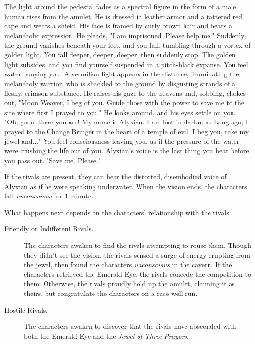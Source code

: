 \documentclass[letterpaper, 11pt, bg=full, twocolumn]{dndbook}
\begin{document}
\begin{DndReadAloud}
The light around the pedestal fades as a spectral figure in the form of a male human rises from the amulet. He is dressed in leather armor and a tattered red cape and wears a shield. His face is framed by curly brown hair and bears a melancholic expression. He pleads, "I am imprisoned. Please help me."
Suddenly, the ground vanishes beneath your feet, and you fall, tumbling through a vortex of golden light. You fall deeper, deeper, deeper, then suddenly stop. The golden light subsides, and you find yourself suspended in a pitch-black expanse. You feel water buoying you. A vermilion light appears in the distance, illuminating the melancholy warrior, who is shackled to the ground by disgusting strands of a fleshy, crimson substance.
He raises his gaze to the heavens and, sobbing, chokes out, "Moon Weaver, I beg of you. Guide those with the power to save me to the site where first I prayed to you." He looks around, and his eyes settle on you. "Oh, gods, there you are! My name is Alyxian. I am lost in darkness. Long ago, I prayed to the Change Bringer in the heart of a temple of evil. I beg you, take my jewel and..."
You feel consciousness leaving you, as if the pressure of the water were crushing the life out of you. Alyxian's voice is the last thing you hear before you pass out. "Save me. Please."
\end{DndReadAloud}

If the rivals are present, they can hear the distorted, disembodied voice of Alyxian as if he were speaking underwater. When the vision ends, the characters fall \textit{unconscious} for 1 minute.

What happens next depends on the characters' relationship with the rivals:

\begin{description}
\item[Friendly or Indifferent Rivals.] The characters awaken to find the rivals attempting to rouse them. Though they didn't see the vision, the rivals sensed a surge of energy erupting from the jewel, then found the characters \textit{unconscious} in the cavern. If the characters retrieved the Emerald Eye, the rivals concede the competition to them. Otherwise, the rivals proudly hold up the amulet, claiming it as theirs, but congratulate the characters on a race well run.
\item[Hostile Rivals.] The characters awaken to discover that the rivals have absconded with both the Emerald Eye and the \textit{Jewel of Three Prayers}.
\end{description}
\end{document}
